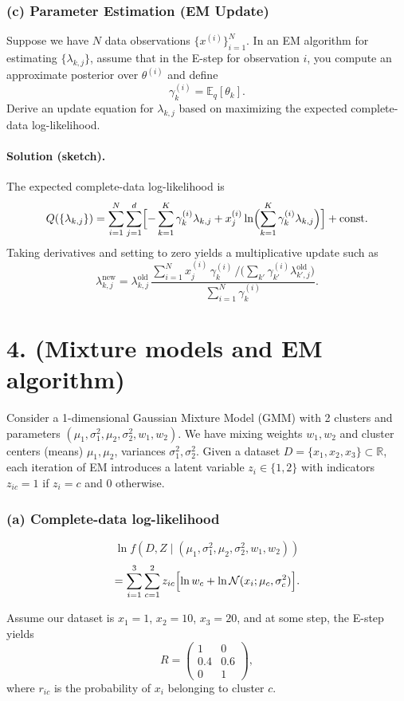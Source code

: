 \documentclass[twocolumn]{article}
\begin{document}
\begin{spacing}{1}
\subsubsection{(c) Parameter Estimation (EM Update)}
Suppose we have $N$ data observations $\{x^{(i)}\}_{i=1}^N$. In an EM algorithm for estimating $\{\lambda_{k,j}\}$, assume that in the E-step for observation $i$, you compute an approximate posterior over $\theta^{(i)}$ and define
\[
\gamma_{k}^{(i)} = \mathbb{E}_q[\theta_k].
\]
Derive an update equation for $\lambda_{k,j}$ based on maximizing the expected complete-data log-likelihood.

\paragraph{Solution (sketch).}
The expected complete-data log-likelihood is
\[
Q(\{\lambda_{k,j}\})
= \sum_{i=1}^N \sum_{j=1}^d \Bigl[
- \sum_{k=1}^K \gamma_k^{(i)} \lambda_{k,j}
+ x_j^{(i)} \ln\Bigl(\sum_{k=1}^K \gamma_k^{(i)} \lambda_{k,j}\Bigr)\Bigr] + \text{const.}
\]
Taking derivatives and setting to zero yields a multiplicative update such as
\[
\lambda_{k,j}^{\text{new}}
= \lambda_{k,j}^{\text{old}}
\,\frac{\sum_{i=1}^N x_j^{(i)} \,\gamma_k^{(i)} \,\Big/\!\!\bigl(\sum_{k'} \gamma_{k'}^{(i)} \lambda_{k',j}^{\text{old}}\bigr)}{\sum_{i=1}^N \gamma_k^{(i)}}.
\]

\bigskip

\section{4. (Mixture models and EM algorithm)}
Consider a 1-dimensional Gaussian Mixture Model (GMM) with 2 clusters and parameters $(\mu_1, \sigma_1^2, \mu_2, \sigma_2^2, w_1, w_2)$. We have mixing weights $w_1, w_2$ and cluster centers (means) $\mu_1, \mu_2$, variances $\sigma_1^2, \sigma_2^2$. Given a dataset $D = \{x_1, x_2, x_3\} \subset \mathbb{R}$, each iteration of EM introduces a latent variable $z_i \in \{1,2\}$ with indicators $z_{ic} = 1$ if $z_i=c$ and 0 otherwise.

\subsubsection{(a) Complete-data log-likelihood}
\[
\ln f(D,Z \mid (\mu_1, \sigma_1^2, \mu_2, \sigma_2^2, w_1, w_2))
\]
\[
= \sum_{i=1}^3 \sum_{c=1}^2 z_{ic} \Bigl[\ln w_c + \ln \mathcal{N}(x_i; \mu_c, \sigma_c^2)\Bigr].
\]

Assume our dataset is $x_1=1$, $x_2=10$, $x_3=20$, and at some step, the E-step yields
\[
R = \begin{pmatrix}
1 & 0 \\
0.4 & 0.6 \\
0 & 1
\end{pmatrix},
\]
where $r_{ic}$ is the probability of $x_i$ belonging to cluster $c$.


\end{spacing}
\end{document}
